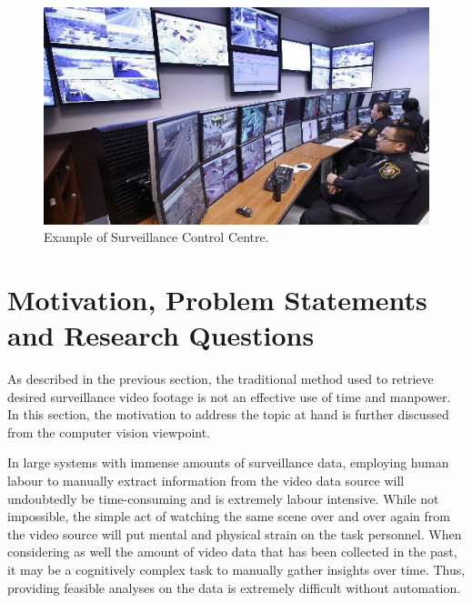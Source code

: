 \begin{figure}[!hbt]\centering
\includegraphics[width=\textwidth]{image/screenshots/observer.jpg}
\caption{Example of Surveillance Control Centre.}
\label{fig:observerdatacenter}
\end{figure}

\section{Motivation, Problem Statements and Research Questions}

As described in the previous section, the traditional method used to retrieve desired surveillance video footage is not an effective use of time and manpower. In this section, the motivation to address the topic at hand is further discussed from the computer vision viewpoint.%


In large systems with immense amounts of surveillance data, employing human labour to manually extract information from the video data source will undoubtedly be time-consuming and is extremely labour intensive.
While not impossible, the simple act of watching the same scene over and over again from the video source will put mental and physical strain on the task personnel. When considering as well the amount of video data that has been collected in the past, it may be a cognitively complex task to manually gather insights over time. Thus, providing feasible analyses on the data is extremely difficult without automation.

